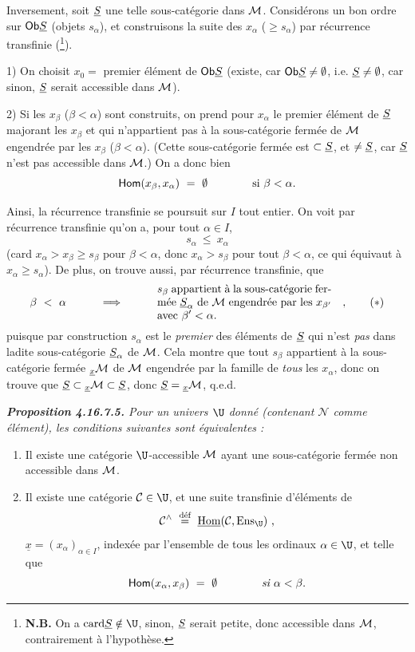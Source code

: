 Inversement, soit $\underline{S}$ une telle sous-catégorie dans $\mathcal{M}$. Considérons un bon ordre sur $\mathsf{Ob} \underline{S}$ (objets $s_\alpha$), et construisons la suite des $x_\alpha$ ($\geqslant s_\alpha$) par récurrence transfinie (\footnote{\textbf{N.B.} On a $\card \uS \notin \U$, sinon, $\underline{S}$ serait petite, donc accessible dans $\mathcal{M}$, contrairement à l'hypothèse.}).

1) On choisit $x_0 =$ premier élément de $\mathsf{Ob} \underline{S}$ (existe, car $\mathsf{Ob} \underline{S} \neq \emptyset$, i.e. $\underline{S} \neq \emptyset$, car sinon, $\underline{S}$ serait accessible dans $\mathcal{M}$).

2) Si les $x_\beta$ ($\beta < \alpha$) sont construits, on prend pour $x_\alpha$ le premier élément de $\underline{S}$ majorant les $x_\beta$ et qui n'appartient pas à la sous-catégorie fermée de $\mathcal{M}$ engendrée par les $x_\beta$ ($\beta < \alpha$). (Cette sous-catégorie fermée est $\subset \underline{S}$, et $\neq \underline{S}$, car $\underline{S}$ n'est pas accessible dans $\mathcal{M}$.) On a donc bien
\[
\mathsf{Hom}(x_\beta, x_\alpha) \ =\ \emptyset \qquad\qquad \text{si } \beta < \alpha.
\]


Ainsi, la récurrence transfinie se poursuit sur $I$ tout entier. On voit par récurrence transfinie qu'on a, pour tout $\alpha \in I$,
\[
s_\alpha \ \leqslant\ x_\alpha
\]
(card $x_\alpha > x_\beta \geqslant s_\beta$ pour $\beta < \alpha$, donc $x_\alpha > s_\beta$ pour tout $\beta < \alpha$, ce qui équivaut à $x_\alpha \geqslant s_\alpha$). De plus, on trouve aussi, par récurrence transfinie, que
\[
\beta \ <\ \alpha \qquad\quad \Longrightarrow \qquad\quad
\text{\parbox[c]{5.5cm}{$s_\beta$ appartient à la sous-catégorie fermée $\uS_\alpha$ de $\cM$ engendrée par les $x_{\beta'}$ avec $\beta' < \alpha$.}}
\quad ,
\tag*{$(*)$}
\]
puisque par construction $s_\alpha$ est le \textit{premier} des éléments de $\underline{S}$ qui n'est \textit{pas} dans ladite sous-catégorie $\underline{S}_\alpha$ de $\mathcal{M}$. Cela montre que tout $s_\beta$ appartient à la sous-catégorie fermée ${}_{\underline{x}}\mathcal{M}$ de $\mathcal{M}$ engendrée par la famille de \textit{tous} les $x_\alpha$, donc on trouve que $\underline{S} \subset {}_{\underline{x}}\mathcal{M} \subset \underline{S}$, donc $\underline{S} = {}_{\underline{x}}\mathcal{M}$, q.e.d.

\begingroup\itshape
\noindent\textbf{\upshape Proposition 4.16.7.5.} Pour un univers $\U$ donné (contenant $\mathcal{N}$ comme élément), les conditions suivantes sont équivalentes :
\begin{enumerate}[label={}]
\item[1)] Il existe une catégorie $\U$-accessible $\mathcal{M}$ ayant une sous-catégorie fermée non accessible %
dans $\mathcal{M}$.
\item[b)] Il existe une catégorie $\cC \in \U$, et une suite transfinie d'éléments de
\[
\cC^\wedge \ \overset{\text{\upshape déf}}{=}\ \underline{\mathrm{Hom}}(\cC, \mathrm{Ens}_{\U}) \ ,
\]
$\underline{x} = (x_\alpha)_{\alpha\in I}$, indexée par l'ensemble de tous les ordinaux $\alpha \in \U$, et telle que
\[
\mathsf{Hom}(x_\alpha, x_\beta) \ =\ \emptyset \qquad\qquad \textit{si } \alpha < \beta.
\]
\end{enumerate}
\endgroup

